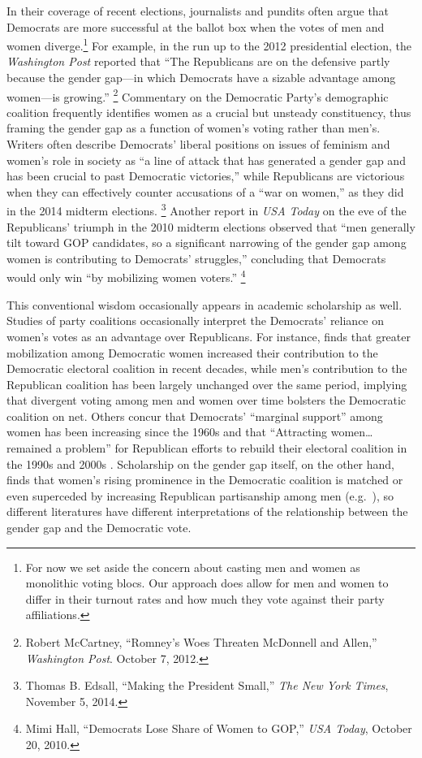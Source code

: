 \documentclass[12pt
               ,final
               ]{article}
\begin{document}

In their coverage of recent elections, journalists and pundits often argue that Democrats are more successful at the ballot box when the votes of men and women diverge.\footnote{For now we set aside the concern about casting men and women as monolithic voting blocs. Our approach does allow for men and women to differ in their turnout rates and how much they vote against their party affiliations.} For example, in the run up to the 2012 presidential election, the \emph{Washington Post} reported that ``The Republicans are on the defensive partly because the gender gap---in which Democrats have a sizable advantage among women---is growing.''%
 \footnote{Robert McCartney, ``Romney's Woes Threaten McDonnell and Allen,'' \textit{Washington Post}. October 7, 2012.}
Commentary on the Democratic Party's demographic coalition frequently identifies women as a crucial but unsteady constituency, thus framing the gender gap as a function of women's voting rather than men's. Writers often describe Democrats' liberal positions on issues of feminism and women's role in society as ``a line of attack that has generated a gender gap and has been crucial to past Democratic victories,'' while Republicans are victorious when they can effectively counter accusations of a ``war on women,'' as they did in the 2014 midterm elections.%
 \footnote{Thomas B. Edsall, ``Making the President Small,'' \textit{The New York Times}, November 5, 2014.}
Another report in \textit{USA Today} on the eve of the Republicans' triumph in the 2010 midterm elections observed that ``men generally tilt toward GOP candidates, so a significant narrowing of the gender gap among women is contributing to Democrats' struggles,'' concluding that Democrats would only win ``by mobilizing women voters.''%
 \footnote{Mimi Hall, ``Democrats Lose Share of Women to GOP,'' \textit{USA Today}, October 20, 2010.}

This conventional wisdom occasionally appears in academic scholarship as well. Studies of party coalitions occasionally interpret the Democrats' reliance on women's votes as an advantage over Republicans. For instance, \citet{zingher2014analysis} finds that greater mobilization among Democratic women increased their contribution to the Democratic electoral coalition in recent decades, while men's contribution to the Republican coalition has been largely unchanged over the same period, implying that divergent voting among men and women over time bolsters the Democratic coalition on net. Others concur that Democrats' ``marginal support'' among women has been increasing since the 1960s \citep{stanley1986partisanship} and that ``Attracting women\ldots remained a problem'' for Republican efforts to rebuild their electoral coalition in the 1990s and 2000s \citep{stanley2006partisanship}. Scholarship on the gender gap itself, on the other hand, finds that women's rising prominence in the Democratic coalition is matched or even superceded by increasing Republican partisanship among men (e.g.\ \citealt{kaufmann1999changing}), so different literatures have different interpretations of the relationship between the gender gap and the Democratic vote. 
\end{document}
